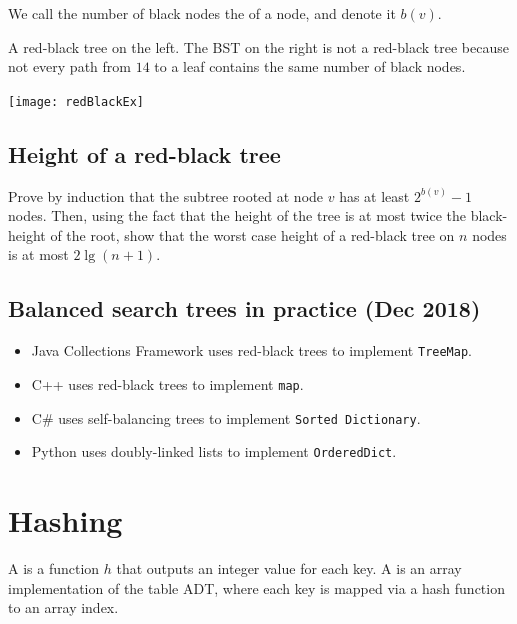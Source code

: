 We call the number of black nodes the  of a node, and denote it $b(v)$.

\begin{Boxample} \label{ex:redblackTreeEx}
A red-black tree on the left. The BST on the right is not a red-black tree 
  because not every path from $14$ to a leaf contains the same number of black nodes.
\begin{center}
  \texttt{[image: redBlackEx]}
\end{center}
\end{Boxample}

\section{Height of a red-black tree}

\begin{Boxample}[5]
Prove by induction that the subtree rooted at node $v$ has at least $2^{b(v)} - 1$ nodes.
Then, using the fact that the height of the tree is at most twice the black-height of the root,  show that the worst case height of a red-black tree on $n$ nodes 
is at most $2 \lg (n+1)$.
\end{Boxample}

\section{Balanced search trees in practice (Dec 2018)}
\begin{itemize}
\item Java Collections Framework uses red-black trees to implement \texttt{TreeMap}.
\item C++ uses red-black trees to implement \texttt{map}.
\item C\# uses self-balancing trees to implement \texttt{Sorted Dictionary}.
\item Python uses doubly-linked lists to implement \texttt{OrderedDict}.
\end{itemize}





\chapter{Hashing} %
\begin{Definition}
A  is a function $h$ that outputs an integer value for each key. 
A  is an array implementation of the table ADT, 
where each key is mapped via a hash function to an array index. 
\end{Definition}

